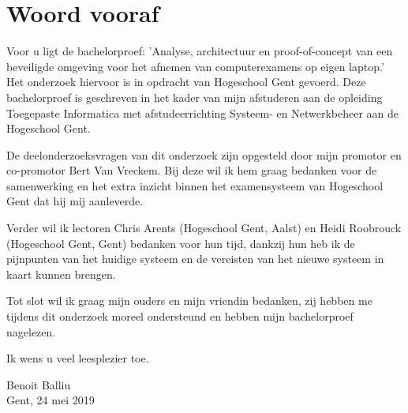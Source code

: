 
\chapter*{Woord vooraf}
\label{ch:voorwoord}


Voor u ligt de bachelorproef: 'Analyse, architectuur en proof-of-concept van een beveiligde omgeving voor het afnemen van computerexamens op eigen laptop.' Het onderzoek hiervoor is in opdracht van Hogeschool Gent gevoerd. Deze bachelorproef is geschreven in het kader van mijn afstuderen aan de opleiding Toegepaste Informatica met afstudeerrichting Systeem- en Netwerkbeheer aan de Hogeschool Gent.

De deelonderzoeksvragen van dit onderzoek zijn opgesteld door mijn promotor en co-promotor Bert Van Vreckem. Bij deze wil ik hem graag bedanken voor de samenwerking en het extra inzicht binnen het examensysteem van Hogeschool Gent dat hij mij aanleverde. 

Verder wil ik lectoren Chris Arents (Hogeschool Gent, Aalst) en Heidi Roobrouck (Hogeschool Gent, Gent) bedanken voor hun tijd, dankzij hun heb ik de pijnpunten van het huidige systeem en de vereisten van het nieuwe systeem in kaart kunnen brengen.

Tot slot wil ik graag mijn ouders en mijn vriendin bedanken, zij hebben me tijdens dit onderzoek moreel ondersteund en hebben mijn bachelorproef nagelezen.

Ik wens u veel leesplezier toe.

Benoit Balliu \\
Gent, 24 mei 2019 